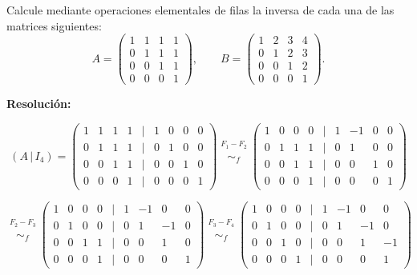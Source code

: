 \documentclass[a4paper,12pt]{article}
\begin{document}
\begin{ejercicio}[title=Ejercicio 14]
Calcule mediante operaciones elementales de filas la inversa de cada una de las matrices siguientes:
\[
A =
\begin{pmatrix}
1 & 1 & 1 & 1\\
0 & 1 & 1 & 1\\
0 & 0 & 1 & 1\\
0 & 0 & 0 & 1
\end{pmatrix}, \qquad
B =
\begin{pmatrix}
1 & 2 & 3 & 4\\
0 & 1 & 2 & 3\\
0 & 0 & 1 & 2\\
0 & 0 & 0 & 1
\end{pmatrix}.
\]

\tcblower
\textbf{Resolución:}

\[
(A \,|\, I_4) =
\begin{pmatrix}
1 & 1 & 1 & 1 &\Big|& 1 & 0 & 0 & 0\\
0 & 1 & 1 & 1 &\Big|& 0 & 1 & 0 & 0\\
0 & 0 & 1 & 1 &\Big|& 0 & 0 & 1 & 0\\
0 & 0 & 0 & 1 &\Big|& 0 & 0 & 0 & 1
\end{pmatrix}
\overset{\substack{F_1 - F_2 \\ {}}}{\sim_f}
\begin{pmatrix}
1 & 0 & 0 & 0 &\Big|& 1 & -1 & 0 & 0\\
0 & 1 & 1 & 1 &\Big|& 0 & 1 & 0 & 0\\
0 & 0 & 1 & 1 &\Big|& 0 & 0 & 1 & 0\\
0 & 0 & 0 & 1 &\Big|& 0 & 0 & 0 & 1
\end{pmatrix}
\]

\[
\overset{\substack{F_2 - F_3 \\ {}}}{\sim_f}
\begin{pmatrix}
1 & 0 & 0 & 0 &\Big|& 1 & -1 & 0 & 0\\
0 & 1 & 0 & 0 &\Big|& 0 & 1 & -1 & 0\\
0 & 0 & 1 & 1 &\Big|& 0 & 0 & 1 & 0\\
0 & 0 & 0 & 1 &\Big|& 0 & 0 & 0 & 1
\end{pmatrix}
\overset{\substack{F_3 - F_4 \\ {}}}{\sim_f}
\begin{pmatrix}
1 & 0 & 0 & 0 &\Big|& 1 & -1 & 0 & 0\\
0 & 1 & 0 & 0 &\Big|& 0 & 1 & -1 & 0\\
0 & 0 & 1 & 0 &\Big|& 0 & 0 & 1 & -1\\
0 & 0 & 0 & 1 &\Big|& 0 & 0 & 0 & 1
\end{pmatrix}
\]


\end{ejercicio}
\end{document}
